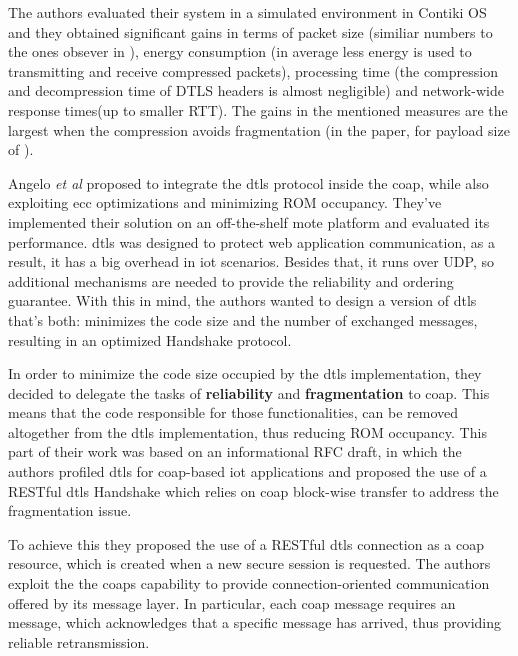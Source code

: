 \documentclass{llncs}
\begin{document}
The authors evaluated their system in a simulated environment in Contiki OS and
they obtained significant gains in terms of packet size (similiar numbers to the
ones obsever in \cite{6LoWPANC53:online}), energy consumption (in average  less
energy is used to transmitting and receive compressed packets), processing time
(the compression and decompression time of DTLS headers is almost negligible)
and network-wide response times(up to  smaller RTT). The
gains in the mentioned measures are the largest when the compression avoids
fragmentation (in the paper, for payload size of ).

Angelo \textit{et al} \cite{Security5:online} proposed to integrate the \gls{dtls} protocol
inside the \gls{coap}, while also exploiting \gls{ecc} optimizations and minimizing
ROM occupancy. They've implemented their solution on an off-the-shelf mote platform
and evaluated its performance. \gls{dtls} was designed to protect web application communication, as a result,
it has a big overhead in \gls{iot} scenarios. Besides that, it runs over UDP,
so additional mechanisms are needed to provide the reliability and ordering
guarantee. With this in mind, the authors wanted to design a version of \gls{dtls}
that's both: minimizes the code size and the number of exchanged messages, resulting
in an optimized Handshake protocol.

In order to minimize the code size occupied by the \gls{dtls} implementation, they
decided to delegate the tasks of \textbf{reliability} and \textbf{fragmentation} to
\gls{coap}. This means that the code responsible for those functionalities,
can be removed altogether from the \gls{dtls} implementation, thus reducing ROM
occupancy. This part of their work was based on an informational RFC draft\cite{I-D.draft-keoh-dtls-profile-iot}, in which the
authors profiled \gls{dtls} for \gls{coap}-based \gls{iot} applications and proposed
the use of a RESTful \gls{dtls} Handshake which relies on \gls{coap} block-wise
transfer to address the fragmentation issue.

To achieve this they  proposed the use of a RESTful \gls{dtls} connection as a \gls{coap} resource,
which is created when a new secure session is requested.
The authors exploit the the \gls{coap}s capability to provide connection-oriented
communication offered by its message layer. In particular, each 
\gls{coap} message requires an  message\cite{RFC7252T66:online},
which acknowledges that a specific  message has arrived, thus
providing reliable retransmission.
\end{document}
